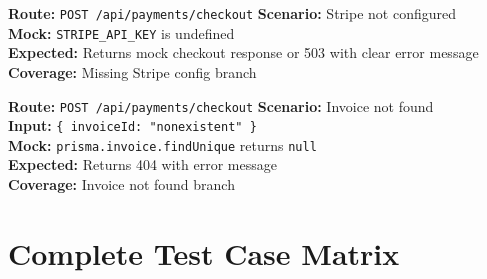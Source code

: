 \documentclass[12pt,a4paper]{report}
\newcommand{\ptwo}{\textbf{\color{p2orange}P2}}
\begin{document}
\begin{tcolorbox}[testbox,title={STRIPE-004 \hfill \ptwo}]
\textbf{Route:} \texttt{POST /api/payments/checkout} \quad \textbf{Scenario:} Stripe not configured \\
\textbf{Mock:} \texttt{STRIPE\_API\_KEY} is undefined \\
\textbf{Expected:} Returns mock checkout response or 503 with clear error message \\
\textbf{Coverage:} Missing Stripe config branch
\end{tcolorbox}

\begin{tcolorbox}[testbox,title={STRIPE-005 \hfill \ptwo}]
\textbf{Route:} \texttt{POST /api/payments/checkout} \quad \textbf{Scenario:} Invoice not found \\
\textbf{Input:} \texttt{\{ invoiceId: "nonexistent" \}} \\
\textbf{Mock:} \texttt{prisma.invoice.findUnique} returns \texttt{null} \\
\textbf{Expected:} Returns 404 with error message \\
\textbf{Coverage:} Invoice not found branch
\end{tcolorbox}

\section{Complete Test Case Matrix}
\end{document}
